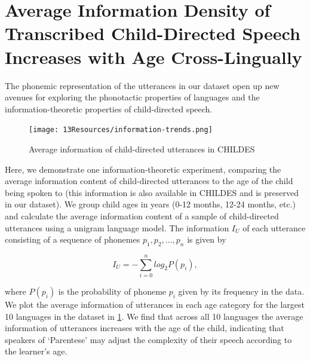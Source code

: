 \section{Average Information Density of Transcribed Child-Directed Speech Increases with Age Cross-Lingually}\label{app:parentese}

The phonemic representation of the utterances in our dataset open up new avenues for exploring the phonotactic properties of languages and the information-theoretic properties of child-directed speech. %


\begin{figure}
    \centering
    \texttt{[image: 13Resources/information-trends.png]}
    \caption{Average information of child-directed utterances in CHILDES}
    \label{fig:13-information-trends}
\end{figure}

Here, we demonstrate one information-theoretic experiment, comparing the average information content of child-directed utterances to the age of the child being spoken to (this information is also available in CHILDES and is preserved in our dataset). We group child ages in years (0-12 months, 12-24 months, etc.) and calculate the average information content of a sample of child-directed utterances using a unigram language model. The information $I_U$ of each utterance consisting of a sequence of phonemes $p_1,p_2,\ldots,p_n$ is given by

$$I_U = -\sum_{i=0}^{n}{log_2P(p_i)},$$

where $P(p_i)$ is the probability of phoneme $p_i$ given by its frequency in the data. We plot the average information of utterances in each age category for the largest 10 languages in the dataset in \cref{fig:13-information-trends}. We find that across all 10 languages the average information of utterances increases with the age of the child, indicating that speakers of `Parentese' may adjust the complexity of their speech according to the learner's age. 

